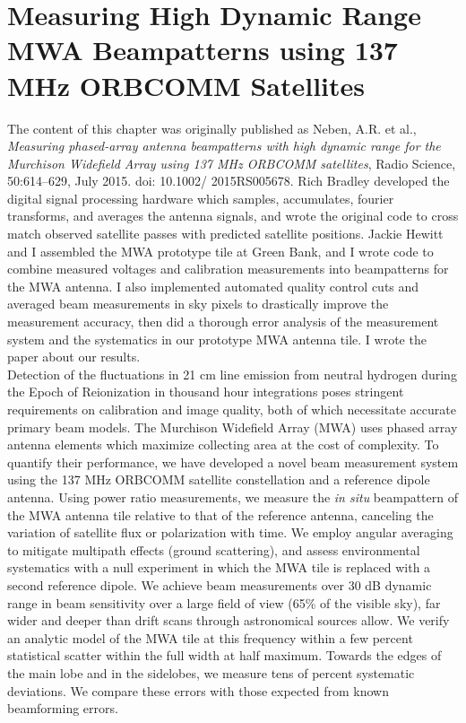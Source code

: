 
\chapter{Measuring High Dynamic Range MWA Beampatterns using 137 MHz ORBCOMM Satellites}
\label{chap:beampaper}

The content of this chapter was originally published as Neben, A.R. et al., \textit{Measuring phased-array antenna beampatterns with high dynamic range for the Murchison Widefield Array using 137 MHz ORBCOMM satellites}, Radio Science, 50:614–629, July 2015. doi: 10.1002/ 2015RS005678. Rich Bradley developed the digital signal processing hardware which samples, accumulates, fourier transforms, and averages the antenna signals, and wrote the original code to cross match observed satellite passes with predicted satellite positions. Jackie Hewitt and I assembled the MWA prototype tile at Green Bank, and I wrote code to combine measured voltages and calibration measurements into beampatterns for the MWA antenna. I also implemented automated quality control cuts and averaged beam measurements in sky pixels to drastically improve the measurement accuracy, then did a thorough error analysis of the measurement system and the systematics in our prototype MWA antenna tile. I wrote the paper about our results.  \\

Detection of the fluctuations in 21 cm line emission from neutral hydrogen during the Epoch of Reionization in thousand hour integrations poses stringent requirements on calibration and image quality, both of which necessitate accurate primary beam models. The Murchison Widefield Array (MWA) uses phased array antenna elements which maximize collecting area at the cost of complexity. To quantify their performance, we have developed a novel beam measurement system using the 137 MHz ORBCOMM satellite constellation and a reference dipole antenna. Using power ratio measurements, we measure the {\it in situ} beampattern of the MWA antenna tile relative to that of the reference antenna, canceling the variation of satellite flux or polarization with time. We employ angular averaging to mitigate multipath effects (ground scattering), and assess environmental systematics with a null experiment in which the MWA tile is replaced with a second reference dipole. We achieve beam measurements over 30 dB dynamic range in beam sensitivity over a large field of view (65\% of the visible sky), far wider and deeper than drift scans through astronomical sources allow. We verify an analytic model of the MWA tile at this frequency within a few percent statistical scatter within the full width at half maximum. Towards the edges of the main lobe and in the sidelobes, we measure tens of percent systematic deviations. We compare these errors with those expected from known beamforming errors. 

